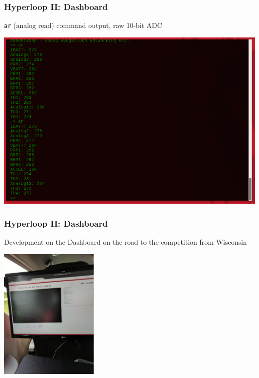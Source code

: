 \documentclass{beamer}
\begin{document}
\begin{frame}
\frametitle{Hyperloop II: Dashboard}
    \texttt{ar} (analog read) command output, raw 10-bit ADC
\begin{center}
    \includegraphics[width=\linewidth]{assets/badgerloop_2/Dashboard/dash_live_ar}
\end{center}
\end{frame}

\begin{frame}
\frametitle{Hyperloop II: Dashboard}
    Development on the Dashboard on the road to the competition from Wisconsin
\begin{center}
    \includegraphics[height=2.5in]{assets/badgerloop_2/Dashboard/in_the_car}
\end{center}
\end{frame}

\end{document}
